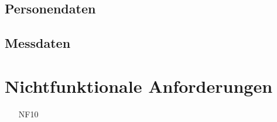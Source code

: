 \documentclass[a4paper,12pt]{article}
\begin{document}








\subsection{Personendaten}
\subsection{Messdaten}

\section{Nichtfunktionale Anforderungen}
\begin{itemize}[nosep]
\leftskip=0.5cm
\item[NF10]
\end{itemize}








\end{document}
